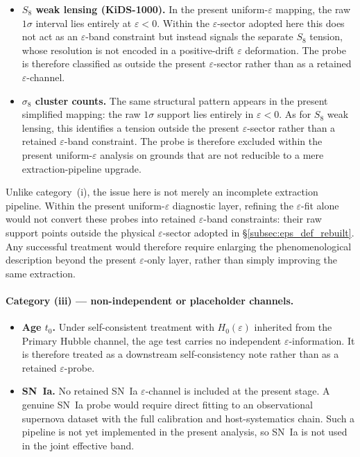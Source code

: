 \begin{itemize}[leftmargin=1.4em,itemsep=2pt,topsep=4pt]
\item \textbf{$S_8$ weak lensing (KiDS-1000).} In the present
uniform-$\varepsilon$ mapping, the raw $1\sigma$ interval lies
entirely at $\varepsilon < 0$. Within the $\varepsilon$-sector adopted
here this does not act as an $\varepsilon$-band constraint but instead
signals the separate $S_8$ tension, whose resolution is not encoded in
a positive-drift $\varepsilon$ deformation. The probe is therefore
classified as outside the present $\varepsilon$-sector rather than as
a retained $\varepsilon$-channel.

\item \textbf{$\sigma_8$ cluster counts.} The same structural pattern
appears in the present simplified mapping: the raw $1\sigma$ support
lies entirely in $\varepsilon < 0$. As for $S_8$ weak lensing, this
identifies a tension outside the present $\varepsilon$-sector rather
than a retained $\varepsilon$-band constraint. The probe is therefore
excluded within the present uniform-$\varepsilon$ analysis on grounds
that are not reducible to a mere extraction-pipeline upgrade.
\end{itemize}

Unlike category~(i), the issue here is not merely an incomplete
extraction pipeline. Within the present uniform-$\varepsilon$
diagnostic layer, refining the $\varepsilon$-fit alone would not
convert these probes into retained $\varepsilon$-band constraints:
their raw support points outside the physical $\varepsilon$-sector
adopted in \S\ref{subsec:eps_def_rebuilt}. Any successful treatment
would therefore require enlarging the phenomenological description
beyond the present $\varepsilon$-only layer, rather than simply
improving the same extraction.

\paragraph{Category (iii) --- non-independent or placeholder channels.}

\begin{itemize}[leftmargin=1.4em,itemsep=2pt,topsep=4pt]
\item \textbf{Age $t_0$.} Under self-consistent treatment with
$H_0(\varepsilon)$ inherited from the Primary Hubble channel, the age
test carries no independent $\varepsilon$-information. It is therefore
treated as a downstream self-consistency note rather than as a
retained $\varepsilon$-probe.

\item \textbf{SN~Ia.} No retained SN~Ia $\varepsilon$-channel is
included at the present stage. A genuine SN~Ia probe would require
direct fitting to an observational supernova dataset with the full
calibration and host-systematics chain. Such a pipeline is not yet
implemented in the present analysis, so SN~Ia is not used in the
joint effective band.
\end{itemize}

